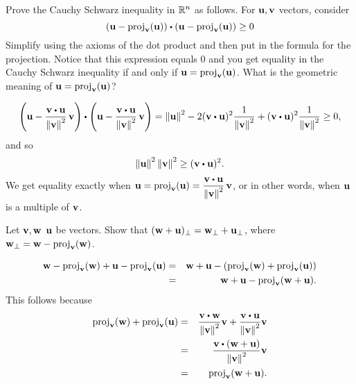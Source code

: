 \begin{ex}
  Prove the Cauchy Schwarz inequality in $\mathbb{R}^n$ as follows.  For
  $\vect{u},\vect{v}$ vectors, consider
  \begin{equation*}
    (\vect{u}-
    \proj_{\vect{v}}(\vect{u})) \dotprod (\vect{u}-
    \proj_{\vect{v}}(\vect{u})) \geq 0
  \end{equation*}
  Simplify using the axioms of the dot product and then put in the
  formula for the projection. Notice that this expression equals $0$
  and you get equality in the Cauchy Schwarz inequality if and only if
  $\vect{u}=\proj_{\vect{v}}(\vect{u})$. What is the geometric
  meaning of $\vect{u}=\proj_{\vect{v}}(\vect{u})$?
  \begin{sol}
    \begin{equation*}
      \paren{\vect{u}-\frac{\vect{v}\dotprod\vect{u}}{\norm{\vect{v}}^2}\,\vect{v}}
      \dotprod
      \paren{\vect{u}-\frac{\vect{v}\dotprod\vect{u}}{\norm{\vect{v}}^2}\,\vect{v}} 
      = \norm{\vect{u}}^2 - 2(\vect{v}\dotprod \vect{u})^2\frac{1}{\norm{\vect{v}}^2}+(\vect{v}\dotprod \vect{u})^2\frac{1}{\norm{\vect{v}}^2}
      \geq 0,
    \end{equation*}
    and so
    \begin{equation*}
      \norm{\vect{u}}^2\norm{\vect{v}}^2
      \geq (\vect{v}\dotprod \vect{u})^2.
    \end{equation*}
    We get equality exactly when
    $\displaystyle\vect{u}=\proj_{\vect{v}}(\vect{u}) =
    \frac{\vect{v}\dotprod \vect{u}}{\norm{\vect{v}}^2}\,\vect{v}$,
    or in other words, when $\vect{u}$ is a multiple of $\vect{v}$.
  \end{sol}
\end{ex}

\begin{ex}\label{perp-linear}
  Let $\vect{v},\vect{w}$ $\vect{u}$ be vectors. Show that
  $(\vect{w}+\vect{u})_{\perp}=\vect{w}_{\perp}+\vect{u}_{\perp}$,
  where $\vect{w}_{\perp}=\vect{w}-\proj_{\vect{v}}(\vect{w})$.
  \begin{sol}
    \begin{eqnarray*}
      \vect{w}-\proj_{\vect{v}}(\vect{w})+\vect{u}-\proj_{\vect{v}}(\vect{u})
      &=& \vect{w}+\vect{u}-(\proj_{\vect{v}}(\vect{w})+\proj_{\vect{v}}(\vect{u})) \\
      &=&\vect{w}+\vect{u}-\proj_{\vect{v}}(\vect{w}+\vect{u}).
    \end{eqnarray*}
    This follows because
    \begin{eqnarray*}
      \proj_{\vect{v}}(\vect{w})+\proj_{\vect{v}}(\vect{u})
      &=& \frac{\vect{v}\dotprod\vect{w}}{\norm{\vect{v}}^2}\vect{v}
          + \frac{\vect{v}\dotprod\vect{u}}{\norm{\vect{v}}^2}\vect{v} \\
      &=& \frac{\vect{v}\dotprod(\vect{w}+\vect{u})}{\norm{\vect{v}}^2}\vect{v} \\
      &=& \proj_{\vect{v}}(\vect{w}+\vect{u}).
    \end{eqnarray*}
  \end{sol}
\end{ex}

